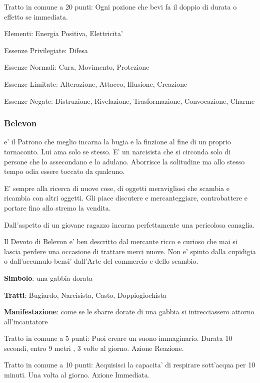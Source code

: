 \documentclass[a4paper,11pt,twoside,openany]{book}
\begin{document}
{		Tratto in comune a 20 punti: Ogni pozione che bevi fa il doppio di durata o effetto se immediata.
		
		\bigskip
		
		Elementi: Energia Positiva, Elettricita'
		
		\bigskip
		
		Essenze Privilegiate: Difesa
		
		Essenze Normali: Cura, Movimento, Protezione
		
		Essenze Limitate: Alterazione, Attacco, Illusione, Creazione
		
		Essenze Negate: Distruzione, Rivelazione, Trasformazione, Convocazione, Charme
		
		\subsubsection{Belevon}
		
		\label{belevon}
		
		e' il Patrono che meglio incarna la bugia e la finzione al fine di un proprio tornaconto. Lui ama solo se stesso. E' un narcisista che si circonda solo di persone che lo assecondano e lo adulano. Aborrisce la solitudine ma allo stesso tempo odia essere toccato da qualcuno.
		
		E' sempre alla ricerca di nuove cose, di oggetti meravigliosi che scambia e ricambia con altri oggetti. Gli piace discutere e mercanteggiare, controbattere e portare fino allo stremo la vendita.
		
		Dall'aspetto di un giovane ragazzo incarna perfettamente una pericolosa canaglia.
		
		Il Devoto di Belevon e' ben descritto dal mercante ricco e curioso che mai si lascia perdere una occasione di trattare merci nuove. Non e' spinto dalla cupidigia o dall'accumulo bensi' dall'Arte del commercio e dello scambio.
		
		\textbf{Simbolo}: una gabbia dorata
		
		\textbf{Tratti}: Bugiardo, Narcisista, Casto, Doppiogiochista
		
		\textbf{Manifestazione}: come se le sbarre dorate di una gabbia si intrecciassero attorno all'incantatore
		
		\bigskip
		
		Tratto in comune a 5 punti: Puoi creare un suono immaginario. Durata 10 secondi, entro 9 metri , 3 volte al giorno. Azione Reazione.
		
		Tratto in comune a 10 punti: Acquisisci la capacita' di respirare sott'acqua per 10 minuti. Una volta al giorno. Azione Immediata.
		
}
\end{document}
